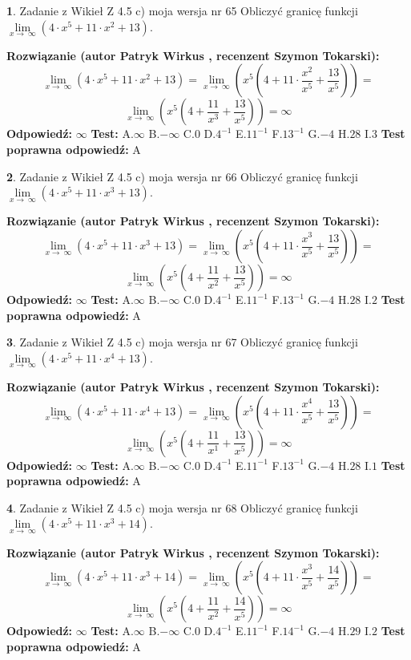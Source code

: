 \documentclass[12pt, a4paper]{article}
\theoremstyle{definition} %
\newtheorem{zad}{}
\newcommand{\zadStart}[1]{\begin{zad}#1\newline}
\newcommand{\zadStop}{\end{zad}}
\newcommand{\rozwStart}[2]{\noindent \textbf{Rozwiązanie (autor #1 , recenzent #2): }\newline}
\newcommand{\rozwStop}{\newline}
\newcommand{\odpStart}{\noindent \textbf{Odpowiedź:}\newline}
\newcommand{\odpStop}{\newline}
\newcommand{\testStart}{\noindent \textbf{Test:}\newline}
\newcommand{\testStop}{\newline}
\newcommand{\kluczStart}{\noindent \textbf{Test poprawna odpowiedź:}\newline}
\newcommand{\kluczStop}{\newline}
\begin{document}
\zadStart{Zadanie z Wikieł Z 4.5 c) moja wersja nr 65}
Obliczyć granicę funkcji  $\lim\limits_{x\to\ \infty}(4 \cdot x^{5}+11 \cdot x^{2}+13)$.
\zadStop
\rozwStart{Patryk Wirkus}{Szymon Tokarski}
$$\lim\limits_{x\to\ \infty}(4 \cdot x^{5}+11 \cdot x^{2}+13) = \lim\limits_{x\to\ \infty}(x^{5}(4 +11 \cdot \frac{x^{2}}{x^{5}}+\frac{13}{x^{5}})) =$$ $$\lim\limits_{x\to\ \infty}(x^{5}(4 +\frac{11}{x^{3}}+\frac{13}{x^{5}})) =\infty$$
\rozwStop
\odpStart
$\infty$
\odpStop
\testStart
A.$\infty$ B.$-\infty$ C.$0$ D.$4^{-1}$ E.$11^{-1}$
F.$13^{-1}$ G.$-4$
H.$28$
I.$3$
\testStop
\kluczStart
A
\kluczStop



\zadStart{Zadanie z Wikieł Z 4.5 c) moja wersja nr 66}
Obliczyć granicę funkcji  $\lim\limits_{x\to\ \infty}(4 \cdot x^{5}+11 \cdot x^{3}+13)$.
\zadStop
\rozwStart{Patryk Wirkus}{Szymon Tokarski}
$$\lim\limits_{x\to\ \infty}(4 \cdot x^{5}+11 \cdot x^{3}+13) = \lim\limits_{x\to\ \infty}(x^{5}(4 +11 \cdot \frac{x^{3}}{x^{5}}+\frac{13}{x^{5}})) =$$ $$\lim\limits_{x\to\ \infty}(x^{5}(4 +\frac{11}{x^{2}}+\frac{13}{x^{5}})) =\infty$$
\rozwStop
\odpStart
$\infty$
\odpStop
\testStart
A.$\infty$ B.$-\infty$ C.$0$ D.$4^{-1}$ E.$11^{-1}$
F.$13^{-1}$ G.$-4$
H.$28$
I.$2$
\testStop
\kluczStart
A
\kluczStop



\zadStart{Zadanie z Wikieł Z 4.5 c) moja wersja nr 67}
Obliczyć granicę funkcji  $\lim\limits_{x\to\ \infty}(4 \cdot x^{5}+11 \cdot x^{4}+13)$.
\zadStop
\rozwStart{Patryk Wirkus}{Szymon Tokarski}
$$\lim\limits_{x\to\ \infty}(4 \cdot x^{5}+11 \cdot x^{4}+13) = \lim\limits_{x\to\ \infty}(x^{5}(4 +11 \cdot \frac{x^{4}}{x^{5}}+\frac{13}{x^{5}})) =$$ $$\lim\limits_{x\to\ \infty}(x^{5}(4 +\frac{11}{x^{1}}+\frac{13}{x^{5}})) =\infty$$
\rozwStop
\odpStart
$\infty$
\odpStop
\testStart
A.$\infty$ B.$-\infty$ C.$0$ D.$4^{-1}$ E.$11^{-1}$
F.$13^{-1}$ G.$-4$
H.$28$
I.$1$
\testStop
\kluczStart
A
\kluczStop



\zadStart{Zadanie z Wikieł Z 4.5 c) moja wersja nr 68}
Obliczyć granicę funkcji  $\lim\limits_{x\to\ \infty}(4 \cdot x^{5}+11 \cdot x^{3}+14)$.
\zadStop
\rozwStart{Patryk Wirkus}{Szymon Tokarski}
$$\lim\limits_{x\to\ \infty}(4 \cdot x^{5}+11 \cdot x^{3}+14) = \lim\limits_{x\to\ \infty}(x^{5}(4 +11 \cdot \frac{x^{3}}{x^{5}}+\frac{14}{x^{5}})) =$$ $$\lim\limits_{x\to\ \infty}(x^{5}(4 +\frac{11}{x^{2}}+\frac{14}{x^{5}})) =\infty$$
\rozwStop
\odpStart
$\infty$
\odpStop
\testStart
A.$\infty$ B.$-\infty$ C.$0$ D.$4^{-1}$ E.$11^{-1}$
F.$14^{-1}$ G.$-4$
H.$29$
I.$2$
\testStop
\kluczStart
A
\kluczStop
\end{document}
